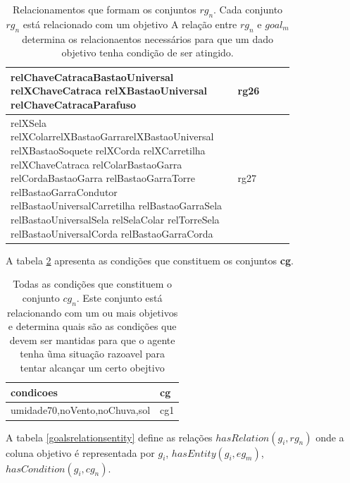 \documentclass[12pt]{article}
\begin{document}
\begin{table}[H]
\begin{tabular}{|p{0.8\linewidth}|l|}
relChaveCatracaBastaoUniversal relXChaveCatraca relXBastaoUniversal relChaveCatracaParafuso                                                                                                                                                                                                                                               & rg26        \\ \hline
relXSela relXColarrelXBastaoGarrarelXBastaoUniversal relXBastaoSoquete relXCorda relXCarretilha relXChaveCatraca relColarBastaoGarra relCordaBastaoGarra relBastaoGarraTorre relBastaoGarraCondutor relBastaoUniversalCarretilha relBastaoGarraSela relBastaoUniversalSela relSelaColar relTorreSela relBastaoUniversalCorda relBastaoGarraCorda & rg27        \\ \hline
\end{tabular}
\caption{Relacionamentos que formam os conjuntos $rg_n$. Cada conjunto $rg_n$ está relacionado com um objetivo A relação entre $rg_n$ e $goal_m$ determina os relacionaentos necessários para que um dado objetivo tenha condição de ser atingido.}
\label{relationsgroup}
\end{table}



A tabela \ref{conditions} apresenta as condições que constituem os conjuntos \textbf{cg}.

\begin{table}[H]
\centering
{}
\begin{tabular}{|l|l|}
\hline
\textbf{condicoes}         & \textbf{cg} \\ \hline
umidade70,noVento,noChuva,sol & cg1         \\ \hline
\end{tabular}
\caption{Todas as condições que constituem o conjunto $cg_n$. Este conjunto está relacionando com um ou mais objetivos e determina quais são as condições que devem ser mantidas para que o agente tenha ũma situação razoavel para tentar alcançar um certo obejtivo}
\label{conditions}
\end{table}


A tabela \ref{goalsrelationsentity} define as relações $hasRelation(g_i,rg_n)$ onde a coluna objetivo é representada por $g_i$, $hasEntity(g_i,eg_m)$, $hasCondition(g_i,cg_n)$.  
\end{document}
